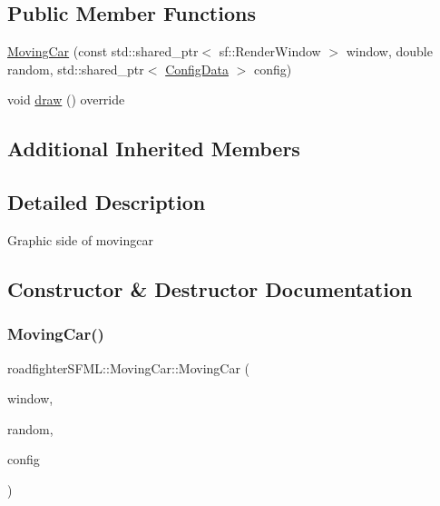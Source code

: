 \subsection*{Public Member Functions}
\begin{DoxyCompactItemize}
\item 
\hyperlink{classroadfighterSFML_1_1MovingCar_a65f36a04c68c9c4756616aabbc029b27}{Moving\+Car} (const std\+::shared\+\_\+ptr$<$ sf\+::\+Render\+Window $>$ window, double random, std\+::shared\+\_\+ptr$<$ \hyperlink{classConfigData}{Config\+Data} $>$ config)
\item 
void \hyperlink{classroadfighterSFML_1_1MovingCar_afff9b85787e5af092cce59be3370a683}{draw} () override
\end{DoxyCompactItemize}
\subsection*{Additional Inherited Members}


\subsection{Detailed Description}
Graphic side of movingcar 

\subsection{Constructor \& Destructor Documentation}
\mbox{\label{classroadfighterSFML_1_1MovingCar_a65f36a04c68c9c4756616aabbc029b27}} 
\subsubsection{\texorpdfstring{Moving\+Car()}{MovingCar()}}
{\footnotesize\ttfamily roadfighter\+S\+F\+M\+L\+::\+Moving\+Car\+::\+Moving\+Car (\begin{DoxyParamCaption}\item[{const std\+::shared\+\_\+ptr$<$ sf\+::\+Render\+Window $>$}]{window,  }\item[{double}]{random,  }\item[{std\+::shared\+\_\+ptr$<$ \hyperlink{classConfigData}{Config\+Data} $>$}]{config }\end{DoxyParamCaption})}

